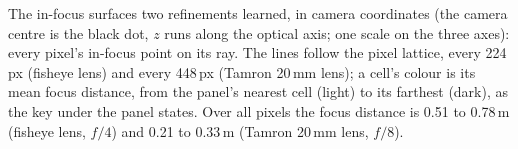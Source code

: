 The in-focus surfaces two refinements learned, in camera coordinates (the camera centre is the black dot, $z$ runs along the optical axis; one scale on the three axes): every pixel's in-focus point on its ray. The lines follow the pixel lattice, every 224\,px (fisheye lens) and every 448\,px (Tamron 20\,mm lens); a cell's colour is its mean focus distance, from the panel's nearest cell (light) to its farthest (dark), as the key under the panel states. Over all pixels the focus distance is 0.51 to 0.78\,m (fisheye lens, $f/4$) and 0.21 to 0.33\,m (Tamron 20\,mm lens, $f/8$).
